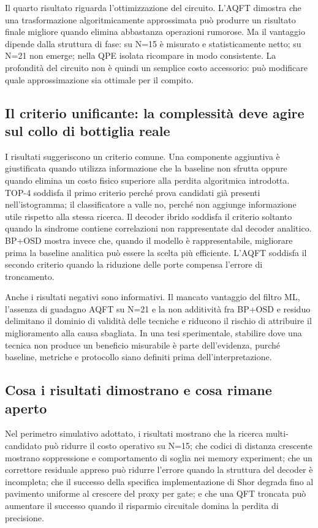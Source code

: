 Il quarto risultato riguarda l'ottimizzazione del circuito. L'AQFT dimostra che una trasformazione algoritmicamente approssimata può produrre un risultato finale migliore quando elimina abbastanza operazioni rumorose. Ma il vantaggio dipende dalla struttura di fase: su N=15 è misurato e statisticamente netto; su N=21 non emerge; nella QPE isolata ricompare in modo consistente. La profondità del circuito non è quindi un semplice costo accessorio: può modificare quale approssimazione sia ottimale per il compito.

\subsection{Il criterio unificante: la complessità deve agire sul collo di bottiglia reale}\label{sec:finale_5_6_2}

I risultati suggeriscono un criterio comune. Una componente aggiuntiva è giustificata quando utilizza informazione che la baseline non sfrutta oppure quando elimina un costo fisico superiore alla perdita algoritmica introdotta. TOP-4 soddisfa il primo criterio perché prova candidati già presenti nell'istogramma; il classificatore a valle no, perché non aggiunge informazione utile rispetto alla stessa ricerca. Il decoder ibrido soddisfa il criterio soltanto quando la sindrome contiene correlazioni non rappresentate dal decoder analitico. BP+OSD mostra invece che, quando il modello è rappresentabile, migliorare prima la baseline analitica può essere la scelta più efficiente. L'AQFT soddisfa il secondo criterio quando la riduzione delle porte compensa l'errore di troncamento.

Anche i risultati negativi sono informativi. Il mancato vantaggio del filtro ML, l'assenza di guadagno AQFT su N=21 e la non additività fra BP+OSD e residuo delimitano il dominio di validità delle tecniche e riducono il rischio di attribuire il miglioramento alla causa sbagliata. In una tesi sperimentale, stabilire dove una tecnica non produce un beneficio misurabile è parte dell'evidenza, purché baseline, metriche e protocollo siano definiti prima dell'interpretazione.

\subsection{Cosa i risultati dimostrano e cosa rimane aperto}\label{sec:finale_5_6_3}

Nel perimetro simulativo adottato, i risultati mostrano che la ricerca multi-candidato può ridurre il costo operativo su N=15; che codici di distanza crescente mostrano soppressione e comportamento di soglia nei memory experiment; che un correttore residuale appreso può ridurre l'errore quando la struttura del decoder è incompleta; che il successo della specifica implementazione di Shor degrada fino al pavimento uniforme al crescere del proxy per gate; e che una QFT troncata può aumentare il successo quando il risparmio circuitale domina la perdita di precisione.

